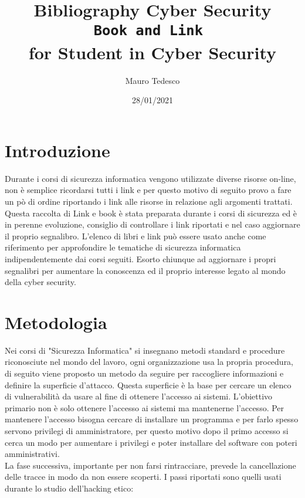 \documentclass[a4paper,12pt]{article}
\title{Bibliography Cyber Security\\ \texttt{Book and Link } \\ for Student in Cyber Security}
\author{Mauro Tedesco }
\date{28/01/2021}
\begin{document}
\maketitle

\tableofcontents

\section{Introduzione}

Durante i corsi di sicurezza informatica vengono utilizzate diverse risorse on-line, non è semplice ricordarsi tutti i link e per questo motivo di seguito provo a fare un pò di ordine riportando i link alle risorse in relazione agli argomenti trattati.
Questa raccolta di Link e book è stata preparata durante i corsi di sicurezza ed è in perenne evoluzione, consiglio di controllare i link riportati e nel caso aggiornare il proprio segnalibro.
L'elenco di libri e link può essere usato anche come riferimento per approfondire le tematiche di sicurezza informatica indipendentemente dai corsi seguiti. Esorto chiunque ad aggiornare i propri segnalibri per aumentare la conoscenza ed il proprio interesse legato al mondo della cyber security.

\section{Metodologia}

Nei corsi di "Sicurezza Informatica" si insegnano metodi standard e procedure riconosciute nel mondo del lavoro, ogni organizzazione usa la propria procedura, di seguito viene proposto un metodo da seguire per  raccogliere informazioni e definire la superficie d'attacco.
Questa superficie è la base per cercare un elenco di vulnerabilità da usare al fine di ottenere l'accesso ai sistemi. 
L'obiettivo primario non è solo ottenere l'accesso ai sistemi ma mantenerne l'accesso.
Per mantenere l'accesso bisogna cercare di installare un programma e per farlo spesso servono privilegi di amministratore, per questo motivo dopo il primo accesso si cerca  un modo per
aumentare i privilegi e poter installare del software con poteri amministrativi.
\\ La fase successiva, importante per non farsi rintracciare, prevede la cancellazione delle tracce
in modo da non essere scoperti.
I passi riportati sono quelli usati durante lo studio dell'hacking etico:
\end{document}
